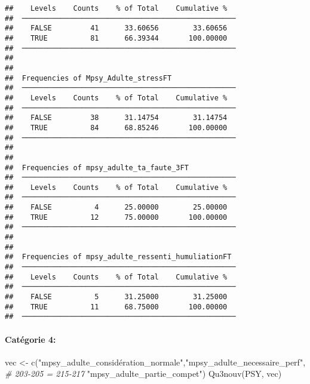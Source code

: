 \documentclass[
]{article}
\newenvironment{Shaded}{\begin{snugshade}}{\end{snugshade}}
\newcommand{\CommentTok}[1]{\textcolor[rgb]{0.56,0.35,0.01}{\textit{#1}}}
\newcommand{\FunctionTok}[1]{\textcolor[rgb]{0.00,0.00,0.00}{#1}}
\newcommand{\NormalTok}[1]{#1}
\newcommand{\OtherTok}[1]{\textcolor[rgb]{0.56,0.35,0.01}{#1}}
\newcommand{\StringTok}[1]{\textcolor[rgb]{0.31,0.60,0.02}{#1}}
\begin{document}
\begin{verbatim}
##    Levels    Counts    % of Total    Cumulative %   
##  ────────────────────────────────────────────────── 
##    FALSE         41      33.60656        33.60656   
##    TRUE          81      66.39344       100.00000   
##  ────────────────────────────────────────────────── 
## 
## 
##  Frequencies of Mpsy_Adulte_stressFT                
##  ────────────────────────────────────────────────── 
##    Levels    Counts    % of Total    Cumulative %   
##  ────────────────────────────────────────────────── 
##    FALSE         38      31.14754        31.14754   
##    TRUE          84      68.85246       100.00000   
##  ────────────────────────────────────────────────── 
## 
## 
##  Frequencies of mpsy_adulte_ta_faute_3FT            
##  ────────────────────────────────────────────────── 
##    Levels    Counts    % of Total    Cumulative %   
##  ────────────────────────────────────────────────── 
##    FALSE          4      25.00000        25.00000   
##    TRUE          12      75.00000       100.00000   
##  ────────────────────────────────────────────────── 
## 
## 
##  Frequencies of mpsy_adulte_ressenti_humuliationFT  
##  ────────────────────────────────────────────────── 
##    Levels    Counts    % of Total    Cumulative %   
##  ────────────────────────────────────────────────── 
##    FALSE          5      31.25000        31.25000   
##    TRUE          11      68.75000       100.00000   
##  ──────────────────────────────────────────────────
\end{verbatim}

\hypertarget{catuxe9gorie-4-1}{%
\paragraph{Catégorie 4:}\label{catuxe9gorie-4-1}}

\begin{Shaded}
\begin{Highlighting}[]
\NormalTok{vec }\OtherTok{\textless{}{-}} \FunctionTok{c}\NormalTok{(}\StringTok{"mpsy\_adulte\_considération\_normale"}\NormalTok{,}\StringTok{"mpsy\_adulte\_necessaire\_perf"}\NormalTok{,  }\CommentTok{\# 203{-}205 = 215{-}217  }
         \StringTok{"mpsy\_adulte\_partie\_compet"}\NormalTok{) }
\FunctionTok{Qu3nouv}\NormalTok{(PSY, vec)}
\end{Highlighting}
\end{Shaded}
\end{document}

